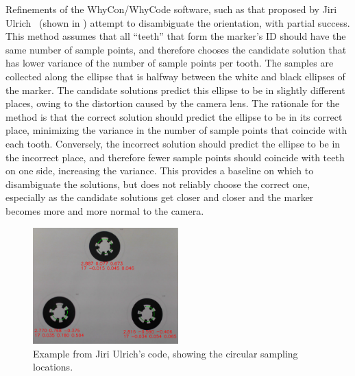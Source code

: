Refinements of the WhyCon/WhyCode software, such as that proposed by Jiri Ulrich~\cite{julrich_whycon} (shown in ) attempt to disambiguate
the orientation, with partial success.
This method assumes that all ``teeth'' that form the marker's ID should have the same number of sample points,
and therefore chooses the candidate solution that has lower variance of the number of sample points per tooth.
The samples are collected along the ellipse that is halfway between the white and black ellipses of the marker.
The candidate solutions predict this ellipse to be in slightly different places,
owing to the distortion caused by the camera lens.
The rationale for the method is that the correct solution should predict the ellipse to be in its correct place,
minimizing the variance in the number of sample points that coincide with each tooth.
Conversely, the incorrect solution should predict the ellipse to be in the incorrect place,
and therefore fewer sample points should coincide with teeth on one side, increasing the variance.
This provides a baseline on which to disambiguate the solutions, but does not reliably choose the correct one,
especially as the candidate solutions get closer and closer and the marker becomes more and more normal to the camera.

\begin{figure}
    \centering
    \includegraphics[width=0.5\textwidth]{images/cropped_whycode_3_8_jiri_example}
    \caption{Example from Jiri Ulrich's code, showing the circular sampling locations.}
    \label{figure:jiri_whycode}
\end{figure}

